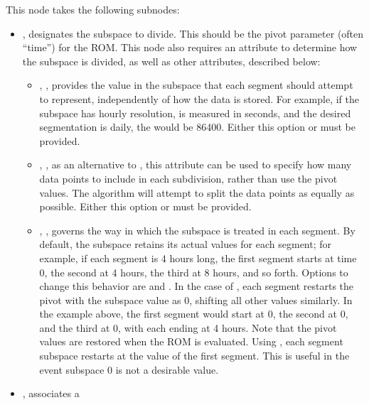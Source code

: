 \begin{itemize}
    This node takes the following subnodes:
    \begin{itemize}
      \item {},  designates the subspace to divide. This
        should be the pivot parameter (often ``time'') for the ROM. This node also requires an attribute
        to determine how the subspace is divided, as well as other attributes, described below:
        \begin{itemize}
          \item {}, , provides the value in the subspace
            that each segment should attempt to represent, independently of how the data is stored. For
            example, if the subspace has hourly resolution, is measured in seconds, and the desired
            segmentation is daily, the  would be 86400.
            Either this option or  must be provided.
          \item {}, , as an alternative to
            , this attribute can be used to specify how many data points to include in
            each subdivision, rather than use the pivot values. The algorithm will attempt to split the data
            points as equally as possible.
            Either this option or  must be provided.
          \item {}, , governs the way in which the subspace is
            treated in each segment. By default, the subspace retains its actual values for each segment; for
            example, if each segment is 4 hours long, the first segment starts at time 0, the second at 4
            hours, the third at 8 hours, and so forth. Options to change this behavior are 
            and . In the case of , each segment restarts the pivot with the
            subspace value as 0, shifting all other values similarly. In the example above, the first segment
            would start at 0, the second at 0, and the third at 0, with each ending at 4 hours. Note that the
            pivot values are restored when the ROM is evaluated. Using , each segment
            subspace restarts at the value of the first segment. This is useful in the event subspace 0 is not
            a desirable value.
        \end{itemize}
      \item {},  associates a 

\end{itemize}
\end{itemize}
